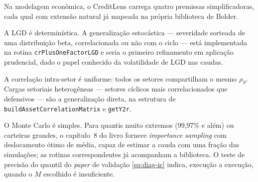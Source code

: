 \documentclass[11pt,a4paper]{article}
\begin{document}
Na modelagem econômica, o CreditLens carrega quatro premissas simplificadoras, cada qual com extensão natural já mapeada na própria biblioteca de Bolder.

A LGD é determinística. A generalização estocástica --- severidade sorteada de uma distribuição beta, correlacionada ou não com o ciclo --- está implementada na rotina \texttt{crPlus\allowbreak One\allowbreak Factor\allowbreak LGD} e seria o primeiro refinamento em aplicação prudencial, dado o papel conhecido da volatilidade de LGD nas caudas.

A correlação intra-setor é uniforme: todos os setores compartilham o mesmo $\rho_S$. Cargas setoriais heterogêneas --- setores cíclicos mais correlacionados que defensivos --- são a generalização direta, na estrutura de \texttt{build\allowbreak Asset\allowbreak Correlation\allowbreak Matrix} e \texttt{getY2r}.

O Monte Carlo é simples. Para quantis muito extremos (99{,}97\% e além) ou carteiras grandes, o capítulo~8 do livro fornece \emph{importance sampling} com deslocamento ótimo de média, capaz de estimar a cauda com uma fração das simulações; as rotinas correspondentes já acompanham a biblioteca. O teste de precisão do quantil do \emph{paper} de validação \eqref{eq:diag-ic} indica, execução a execução, quando o $M$ escolhido é insuficiente.
\end{document}
